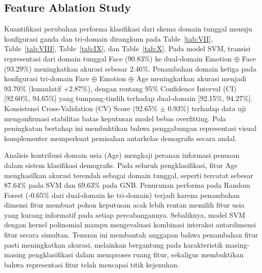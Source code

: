 \subsection{Feature Ablation Study}
\label{sec:feature_ablation}
\label{sec:feature_ablation_study}

Kuantifikasi perubahan performa klasifikasi dari skema domain tunggal menuju konfigurasi ganda dan tri-domain dirangkum pada Table~\ref{tab:VII}, Table~\ref{tab:VIII}, Table~\ref{tab:IX}, dan Table~\ref{tab:X}. Pada model SVM, transisi representasi dari domain tunggal Face (90.83\%) ke dual-domain Emotion $\oplus$ Face (93.29\%) meningkatkan akurasi sebesar 2.46\%. Penambahan domain ketiga pada konfigurasi tri-domain Face $\oplus$ Emotion $\oplus$ Age meningkatkan akurasi menjadi 93.70\% (kumulatif +2.87\%), dengan rentang 95\% Confidence Interval (CI) [92.60\%, 94.65\%] yang tumpang-tindih terhadap dual-domain [92.15\%, 94.27\%]. Konsistensi Cross-Validation (CV) Score (92.65\% $\pm$ 0.93\%) terhadap data uji mengonfirmasi stabilitas batas keputusan model bebas overfitting. Pola peningkatan bertahap ini membuktikan bahwa penggabungan representasi visual komplementer memperkuat pemisahan antarkelas demografis secara andal.

Analisis kontribusi domain usia (Age) mengkaji peranan informasi penuaan dalam sistem klasifikasi demografis. Pada seluruh pengklasifikasi, fitur Age menghasilkan akurasi terendah sebagai domain tunggal, seperti tercatat sebesar 87.64\% pada SVM dan 69.63\% pada GNB. Penurunan performa pada Random Forest (-0.65\% dari dual-domain ke tri-domain) terjadi karena penambahan dimensi fitur membuat pohon keputusan acak lebih rentan memilih fitur usia yang kurang informatif pada setiap percabangannya. Sebaliknya, model SVM dengan kernel polinomial mampu mengevaluasi kombinasi interaksi antardimensi fitur secara simultan. Temuan ini membantah anggapan bahwa penambahan fitur pasti meningkatkan akurasi, melainkan bergantung pada karakteristik masing-masing pengklasifikasi dalam memproses ruang fitur, sekaligus membuktikan bahwa representasi fitur telah mencapai titik kejenuhan.
